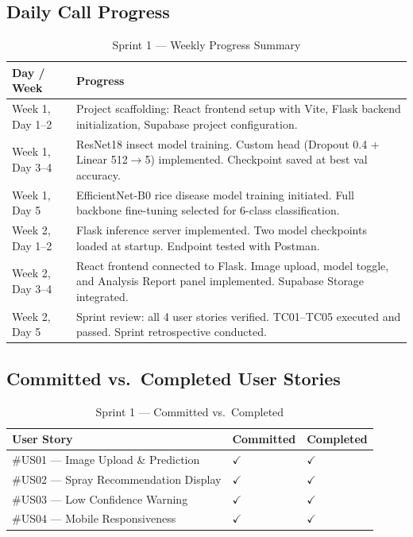 \documentclass[12pt,a4paper]{report}
\begin{document}
\subsection{Daily Call Progress}

\begin{table}[H]
\centering
\caption{Sprint 1 --- Weekly Progress Summary}
\label{tab:sprint1_progress}
\renewcommand{\arraystretch}{1.4}
\begin{tabular}{|p{3cm}|p{10.5cm}|}
\hline
\textbf{Day / Week} & \textbf{Progress} \\
\hline
Week 1, Day 1--2 & Project scaffolding: React frontend setup with Vite, Flask backend initialization, Supabase project configuration. \\
\hline
Week 1, Day 3--4 & ResNet18 insect model training. Custom head (Dropout 0.4 + Linear 512$\rightarrow$5) implemented. Checkpoint saved at best val accuracy. \\
\hline
Week 1, Day 5 & EfficientNet-B0 rice disease model training initiated. Full backbone fine-tuning selected for 6-class classification. \\
\hline
Week 2, Day 1--2 & Flask inference server implemented. Two model checkpoints loaded at startup. Endpoint tested with Postman. \\
\hline
Week 2, Day 3--4 & React frontend connected to Flask. Image upload, model toggle, and Analysis Report panel implemented. Supabase Storage integrated. \\
\hline
Week 2, Day 5 & Sprint review: all 4 user stories verified. TC01--TC05 executed and passed. Sprint retrospective conducted. \\
\hline
\end{tabular}
\end{table}

\subsection{Committed vs.\ Completed User Stories}

\begin{table}[H]
\centering
\caption{Sprint 1 --- Committed vs.\ Completed}
\label{tab:sprint1_cvc}
\renewcommand{\arraystretch}{1.4}
\begin{tabular}{|p{8cm}|p{2.5cm}|p{2.5cm}|}
\hline
\textbf{User Story} & \textbf{Committed} & \textbf{Completed} \\
\hline
\#US01 --- Image Upload \& Prediction & $\checkmark$ & $\checkmark$ \\
\hline
\#US02 --- Spray Recommendation Display & $\checkmark$ & $\checkmark$ \\
\hline
\#US03 --- Low Confidence Warning & $\checkmark$ & $\checkmark$ \\
\hline
\#US04 --- Mobile Responsiveness & $\checkmark$ & $\checkmark$ \\
\hline
\end{tabular}
\end{table}
\end{document}
